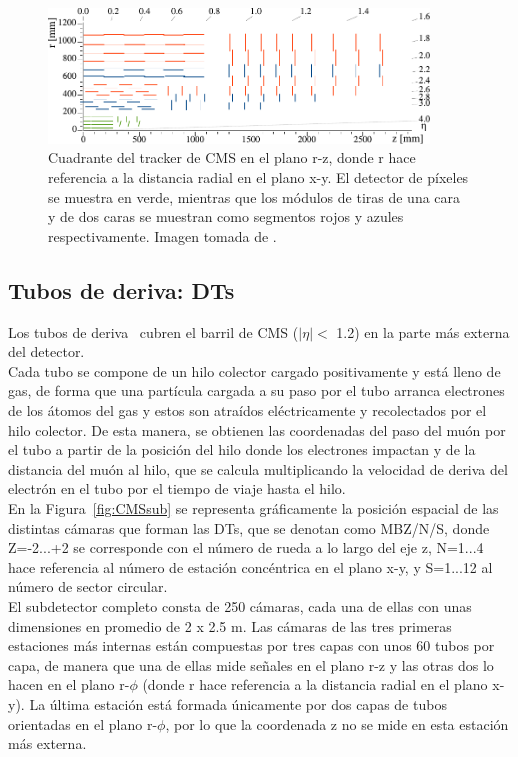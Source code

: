 \begin{figure}[h]
\centering
\includegraphics[width=0.9\textwidth]{figures/Phase1_Tracker_1Quarter.png}
\caption{Cuadrante del tracker de CMS en el plano r-z, donde r hace referencia a la distancia radial en el plano x-y. El detector de p\'ixeles se muestra en verde, mientras que los m\'odulos de tiras de una cara y de dos caras se muestran como segmentos rojos y azules respectivamente. Imagen tomada de \cite{trackerplot}.}
\label{fig:tracker}
\end{figure}


\subsection{Tubos de deriva: DTs}\label{sec:DTs}

Los tubos de deriva~\cite{DTperformance} cubren el barril de CMS ($\lvert \eta \rvert <$ 1.2) en la parte m\'as externa del detector. \\
Cada tubo se compone de un hilo colector cargado positivamente y est\'a lleno de gas, de forma que una part\'icula cargada a su paso por el tubo arranca electrones de los \'atomos del gas y estos son atra\'idos el\'ectricamente y recolectados por el hilo colector. De esta manera, se obtienen las coordenadas del paso del mu\'on por el tubo a partir de la posici\'on del hilo donde los electrones impactan y de la distancia del mu\'on al hilo, que se calcula multiplicando la velocidad de deriva del electr\'on en el tubo por el tiempo de viaje hasta el hilo. \\

En la Figura~\ref{fig:CMSsub} se representa gr\'aficamente la posici\'on espacial de las distintas c\'amaras que forman las DTs, que se denotan como MBZ/N/S, donde Z=-2...+2 se corresponde con el n\'umero de rueda a lo largo del eje z, N=1...4 hace referencia al n\'umero de estaci\'on conc\'entrica en el plano x-y, y S=1...12 al n\'umero de sector circular. \\

El subdetector completo consta de 250 c\'amaras, cada una de ellas con unas dimensiones en promedio de 2 x 2.5 m. Las c\'amaras de las tres primeras estaciones m\'as internas est\'an compuestas por tres capas con unos 60 tubos por capa, de manera que una de ellas mide se\~nales en el plano r-z y las otras dos lo hacen en el plano r-$\phi$ (donde r hace referencia a la distancia radial en el plano x-y). La \'ultima estaci\'on est\'a formada \'unicamente por dos capas de tubos orientadas en el plano r-$\phi$, por lo que la coordenada z no se mide en esta estaci\'on m\'as externa. \\


